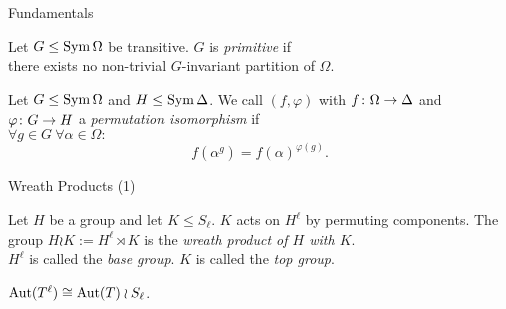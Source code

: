 \begin{frame}{Fundamentals}
    \begin{defn}
        Let $G \leq \operatorname{Sym} \Omega$ be transitive.
        $G$ is \emph{primitive} if
        \\
        there exists no non-trivial
        $G$-invariant partition of $\Omega$.
    \end{defn}
    \pause

    \begin{defn}
        Let $G \leq \operatorname{Sym} \Omega$ and $H \leq \operatorname{Sym} \Delta$.
        We call $(f, \varphi)$ with
        $f \colon \Omega \rightarrow \Delta$
        and
        $\varphi \colon G \rightarrow H$
        a \emph{permutation isomorphism}
        if
        \\
        \pause
        $\forall g \in G ~ \forall \alpha \in \Omega :$
        \[
            f(\alpha ^ g) = f(\alpha) ^ {\varphi(g)}.
        \]
    \end{defn}
\end{frame}


\begin{frame}{Wreath Products (1)}
    \begin{defn}
        Let $H$ be a group and let $K \leq S_\ell$.
        $K$ acts on $H ^ \ell$ by permuting components.
        \pause
        The group
        $H \wr K := H ^ \ell \rtimes K$
        is the \emph{wreath product of $H$ with $K$}.
        \\
        \pause
        $H ^ \ell$ is called the \emph{base group}.
        \pause
        $K$ is called the \emph{top group}.
    \end{defn}
    \vspace{1em}
    \pause
    \begin{thm}
        $\operatorname{Aut}( T ^ \ell ) \cong \operatorname{Aut}(T) \wr S_\ell$.
    \end{thm}
\end{frame}

